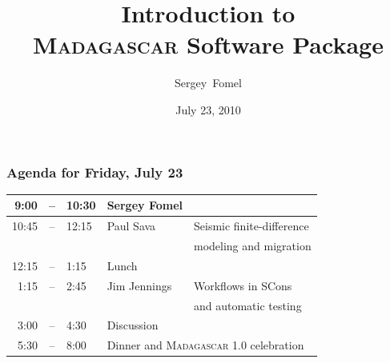 \bfseries

\title[PTTC School and Workshop in Houston 2010]{Introduction to \\ \textsc{Madagascar} Software Package}

\author[S. Fomel] %
{Sergey~Fomel}


\date{July 23, 2010}


\newcommand{\quotebox}[3]{
  \begin{beamercolorbox}[wd=\textwidth,center]{quotecol}
    \begin{quote}
      #1 
      \color{blue}{\emph{#2}, #3}
    \end{quote}
    \end{beamercolorbox}
}

\begin{frame}
  \MadLogo
  \PTTCLogo
  \titlepage
\end{frame}

\begin{frame}
\MadLogo
\frametitle{Agenda for Friday, July 23}
\noindent\begin{tabular}{|rcl|l|l|} 
\hline 
9:00 & -- & 10:30 & Sergey Fomel & {\color{blue}{Introduction}} \\
\hline
10:45 & -- & 12:15 & Paul Sava & Seismic finite-difference \\
          &      &           &                & modeling and migration \\
\hline 12:15 & -- & 1:15 & \multicolumn{2}{|l|}{Lunch} \\
\hline 1:15 & -- & 2:45 & Jim Jennings & Workflows in SCons \\
                  &      &         &                      & and
                  automatic testing \\
\hline 3:00 & -- & 4:30 & \multicolumn{2}{|l|}{Discussion} \\
\hline 5:30 & -- & 8:00 & \multicolumn{2}{|l|}{Dinner and
  \textsc{Madagascar}  1.0 celebration} \\
\hline 
\end{tabular}
\end{frame}

